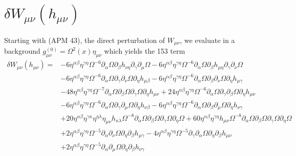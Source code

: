\documentclass[10pt,letterpaper]{article}
\begin{document}
\section{$\delta W_{\mu\nu}(h_{\mu\nu})$}
Starting with (APM 43), the direct perturbation of $W_{\mu\nu}$, we evaluate in a background $g_{\mu\nu}^{(0)} = \Omega^2(x) \eta_{\mu\nu}$ which yields the 153 term
\begin{align}
\delta W_{\mu\nu}(h_{\mu\nu})={}&-6 \eta^{\alpha \beta} \eta^{\gamma \eta} \Omega^{-6} \partial_{\alpha}\Omega \partial_{\beta}h_{\nu \eta} \partial_{\gamma}\partial_{\mu}\Omega
 - 6 \eta^{\alpha \beta} \eta^{\gamma \eta} \Omega^{-6} \partial_{\alpha}\Omega \partial_{\beta}h_{\mu \eta} \partial_{\gamma}\partial_{\nu}\Omega\nonumber\\
& - 6 \eta^{\alpha \beta} \eta^{\gamma \eta} \Omega^{-6} \partial_{\alpha}\Omega \partial_{\gamma}\partial_{\nu}\Omega \partial_{\eta}h_{\mu \beta}
 - 6 \eta^{\alpha \beta} \eta^{\gamma \eta} \Omega^{-6} \partial_{\alpha}\Omega \partial_{\beta}\partial_{\nu}\Omega \partial_{\eta}h_{\mu \gamma}\nonumber\\
& - 48 \eta^{\alpha \beta} \eta^{\gamma \eta} \Omega^{-7} \partial_{\alpha}\Omega \partial_{\beta}\Omega \partial_{\gamma}\Omega \partial_{\eta}h_{\mu \nu}
 + 24 \eta^{\alpha \beta} \eta^{\gamma \eta} \Omega^{-6} \partial_{\alpha}\Omega \partial_{\gamma}\partial_{\beta}\Omega \partial_{\eta}h_{\mu \nu}\nonumber\\
& - 6 \eta^{\alpha \beta} \eta^{\gamma \eta} \Omega^{-6} \partial_{\alpha}\Omega \partial_{\gamma}\partial_{\mu}\Omega \partial_{\eta}h_{\nu \beta}
 - 6 \eta^{\alpha \beta} \eta^{\gamma \eta} \Omega^{-6} \partial_{\alpha}\Omega \partial_{\beta}\partial_{\mu}\Omega \partial_{\eta}h_{\nu \gamma}\nonumber\\
& + 20 \eta^{\alpha \beta} \eta^{\gamma \kappa} \eta^{\eta \lambda} \eta_{\mu \nu} h_{\kappa \lambda} \Omega^{-8} \partial_{\alpha}\Omega \partial_{\beta}\Omega \partial_{\gamma}\Omega \partial_{\eta}\Omega
 + 60 \eta^{\alpha \beta} \eta^{\gamma \eta} h_{\mu \nu} \Omega^{-8} \partial_{\alpha}\Omega \partial_{\beta}\Omega \partial_{\gamma}\Omega \partial_{\eta}\Omega\nonumber\\
& + 2 \eta^{\alpha \beta} \eta^{\gamma \eta} \Omega^{-5} \partial_{\alpha}\partial_{\nu}\Omega \partial_{\eta}\partial_{\beta}h_{\mu \gamma}
 - 4 \eta^{\alpha \beta} \eta^{\gamma \eta} \Omega^{-5} \partial_{\gamma}\partial_{\alpha}\Omega \partial_{\eta}\partial_{\beta}h_{\mu \nu}\nonumber\\
& + 2 \eta^{\alpha \beta} \eta^{\gamma \eta} \Omega^{-5} \partial_{\alpha}\partial_{\mu}\Omega \partial_{\eta}\partial_{\beta}h_{\nu \gamma}

\end{align}
\end{document}
